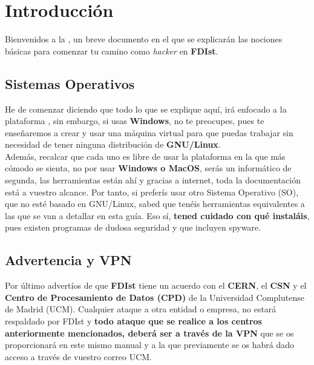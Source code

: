 \newpage
\section{Introducción}
Bienvenidos a la , un breve documento en el que se explicarán las nociones básicas para comenzar tu camino como \textit{hacker} en \textbf{FDIst}.
\newline
\noindent
\subsection{Sistemas Operativos}
\noindent
He de comenzar diciendo que todo lo que se explique aquí, irá enfocado a la plataforma , sin embargo, si usas \textbf{Windows}, no te preocupes, pues te enseñaremos a crear y usar una máquina virtual para que puedas trabajar sin necesidad de tener ninguna distribución de \textbf{GNU/Linux}.
\newline\\
Además, recalcar que cada uno es libre de usar la plataforma en la que más cómodo se sienta, no por usar \textbf{Windows o MacOS}, serás un informático de segunda, las herramientas están ahí y gracias a internet, toda la documentación está a vuestro alcance. Por tanto, si preferís usar otro Sistema Operativo (SO), que no esté basado en GNU/Linux, sabed que tenéis herramientas equivalentes a las que se van a detallar en esta guía. Eso sí, \textbf{tened cuidado con qué instaláis}, pues existen programas de dudosa seguridad y que incluyen spyware.
\subsection{Advertencia y VPN}
\noindent
Por último advertíos de que \textbf{FDIst} tiene un acuerdo con el \textbf{CERN}, el \textbf{CSN} y el \textbf{Centro de Procesamiento de Datos (CPD)} de la Universidad Complutense de Madrid (UCM). Cualquier ataque a otra entidad o empresa, no estará respaldado por FDIst y \textbf{todo ataque que se realice a los centros anteriormente mencionados, deberá ser a través de la VPN} que se os proporcionará en este mismo manual y a la que previamente se os habrá dado acceso a través de vuestro correo UCM.